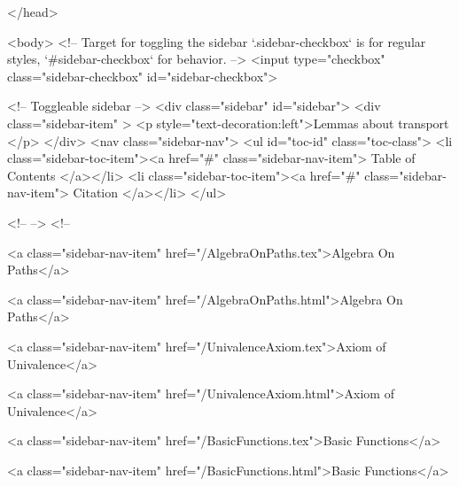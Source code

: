   
</head>




  <body>
    <!-- Target for toggling the sidebar `.sidebar-checkbox` is for regular
     styles, `#sidebar-checkbox` for behavior. -->
<input type="checkbox" class="sidebar-checkbox" id="sidebar-checkbox">

<!-- Toggleable sidebar -->
<div class="sidebar" id="sidebar">
  <div class="sidebar-item" >
    <p style="text-decoration:left">Lemmas about transport </p>
  </div>
  <nav class="sidebar-nav">
    <ul id="toc-id" class="toc-class">
  <li class="sidebar-toc-item"><a href="#" class="sidebar-nav-item"> Table of Contents </a></li>
  <li class="sidebar-toc-item"><a href="#" class="sidebar-nav-item"> Citation </a></li>
</ul>


    <!--  -->
    <!-- 
      
    
      
    
      
    
      
        
      
    
      
        
          <a class="sidebar-nav-item" href="/AlgebraOnPaths.tex">Algebra On Paths</a>
        
      
    
      
        
          <a class="sidebar-nav-item" href="/AlgebraOnPaths.html">Algebra On Paths</a>
        
      
    
      
        
          <a class="sidebar-nav-item" href="/UnivalenceAxiom.tex">Axiom of Univalence</a>
        
      
    
      
        
          <a class="sidebar-nav-item" href="/UnivalenceAxiom.html">Axiom of Univalence</a>
        
      
    
      
        
          <a class="sidebar-nav-item" href="/BasicFunctions.tex">Basic Functions</a>
        
      
    
      
        
          <a class="sidebar-nav-item" href="/BasicFunctions.html">Basic Functions</a>
        
      
    
      
        
